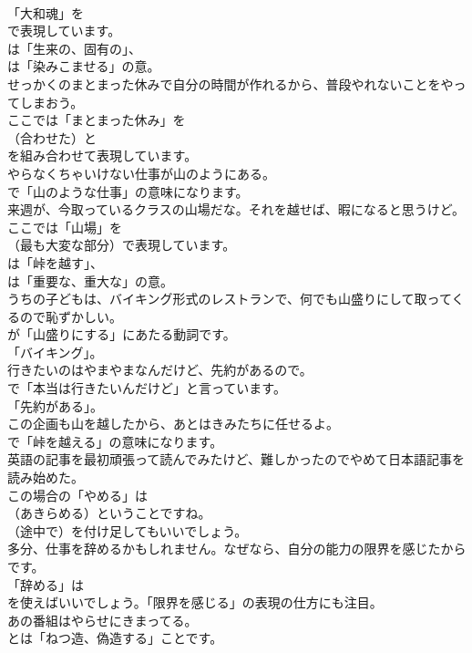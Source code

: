 \documentclass[8pt]{extreport}
\begin{document}
\begin{CJK}{UTF8}{min}
\\	「大和魂」を 
\\	で表現しています。
\\	は「生来の、固有の」、
\\	は「染みこませる」の意。	
\\	せっかくのまとまった休みで自分の時間が作れるから、普段やれないことをやってしまおう。 
\\	ここでは「まとまった休み」を 
\\	（合わせた）と 
\\	を組み合わせて表現しています。	
\\	やらなくちゃいけない仕事が山のようにある。 
\\	で「山のような仕事」の意味になります。	
\\	来週が、今取っているクラスの山場だな。それを越せば、暇になると思うけど。 
\\	ここでは「山場」を 
\\	（最も大変な部分）で表現しています。
\\	は「峠を越す」、
\\	は「重要な、重大な」の意。	
\\	うちの子どもは、バイキング形式のレストランで、何でも山盛りにして取ってくるので恥ずかしい。 
\\	が「山盛りにする」にあたる動詞です。
\\	「バイキング」。	
\\	行きたいのはやまやまなんだけど、先約があるので。 
\\	で「本当は行きたいんだけど」と言っています。
\\	「先約がある」。	
\\	この企画も山を越したから、あとはきみたちに任せるよ。 
\\	で「峠を越える」の意味になります。	
\\	英語の記事を最初頑張って読んでみたけど、難しかったのでやめて日本語記事を読み始めた。 
\\	この場合の「やめる」は
\\	（あきらめる）ということですね。
\\	（途中で）を付け足してもいいでしょう。	
\\	多分、仕事を辞めるかもしれません。なぜなら、自分の能力の限界を感じたからです。 
\\	「辞める」は
\\	を使えばいいでしょう。「限界を感じる」の表現の仕方にも注目。	
\\	あの番組はやらせにきまってる。 
\\	とは「ねつ造、偽造する」ことです。	

\end{CJK}
\end{document}
